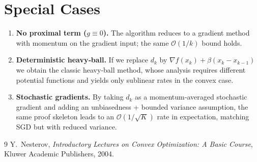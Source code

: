 \documentclass{article}
\begin{document}
\section*{Special Cases}
\begin{enumerate}[label=(\alph*)]
\item \textbf{No proximal term ($g\equiv0$).}  The algorithm reduces to a gradient method with momentum on the gradient input; the same $\mathcal{O}(1/k)$ bound holds.
\item \textbf{Deterministic heavy‑ball.}  If we replace $d_k$ by $ \nabla f(x_k)+\beta (x_k-x_{k-1})$ we obtain the classic heavy‑ball method, whose analysis requires different potential functions and yields only sublinear rates in the convex case.
\item \textbf{Stochastic gradients.}  By taking $d_k$ as a momentum‑averaged stochastic gradient and adding an unbiasedness + bounded variance assumption, the same proof skeleton leads to an $\mathcal{O}(1/\sqrt{K})$ rate in expectation, matching SGD but with reduced variance.
\end{enumerate}

\begin{thebibliography}{9}
Y.~Nesterov, \emph{Introductory Lectures on Convex Optimization: A Basic Course}, Kluwer Academic Publishers, 2004.
\end{thebibliography}
\end{document}
